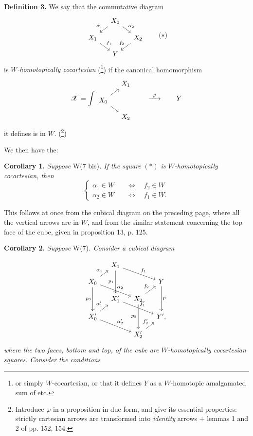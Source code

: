 \documentclass[11pt]{article}
\newcommand{\printedpage}[1]{\marginpar{\footnotesize p.~#1}}
\newcommand{\msp}[1]{\marginpar{\footnotesize [#1]}}
\newcommand{\sX}{\mathscr{X}}
\begin{document}
\setcounter{footnote}{85}
\textbf{Definition 3.} We say that the commutative diagram
\[
\begin{tikzcd}[row sep=small, column sep=small]
 & X_0 \arrow[dl, "\alpha_1"'] \arrow[dr, "\alpha_2"] & \\
X_1 \arrow[dr, "f_1"] & & X_2 \arrow[dl, "f_2"'] \\
 & Y &
\end{tikzcd}
\tag*{$(*)$}
\]
is \textit{$W$-homotopically cocartesian} (\footnote{or simply $W$-cocartesian, or that it defines $Y$ as a $W$-homotopic amalgamated sum of etc.}) if the canonical homomorphism
\[
\sX = \int
\begin{tikzcd}[row sep=small, column sep=small]
 & X_1 \\
X_0 \arrow[ur] \arrow[dr] & \\
 & X_2
\end{tikzcd}
\qquad \xrightarrow{\ \varphi\ } \qquad Y
\]
it defines is in $W$. (\footnote{Introduce $\varphi$ in a proposition in due form, and give its essential properties: strictly cartesian arrows are transformed into \textit{identity} arrows $+$ lemmas 1 and 2 of pp. 152, 154.})

\msp{page 132}
We then have the:

\textbf{Corollary 1.} \textit{Suppose} W(7 bis)\textit{. If the square} $(*)$ \textit{is $W$-homotopically cocartesian, then}
\[
\left\{
\begin{aligned}
\alpha_1 \in W &\quad\iff\quad f_2 \in W \\
\alpha_2 \in W &\quad\iff\quad f_1 \in W.
\end{aligned}
\right.
\]

This follows at once from the cubical diagram on the preceding page, where all the vertical arrows are in $W$, and from the similar statement concerning the top face of the cube, given in proposition 13, p. 125.

\textbf{Corollary 2.} \textit{Suppose} W(7)\textit{. Consider a cubical diagram}

\printedpage{90}
\[
\begin{tikzcd}[row sep=small, column sep=small]
 & X_1 \arrow[dd, "p_1"'] \arrow[rrd, "f_1"] & & \\
X_0 \arrow[ru, "\alpha_1"] \arrow[rrd, "\alpha_2"] \arrow[dd, "p_0"'] & & & Y \arrow[dd, "p"] \\
 & X'_1 \arrow[rrd, "f'_1"] & X_2 \arrow[ru, "f_2"] \arrow[dd, "p_2"'] & \\
X'_0 \arrow[ru, "\alpha'_1"] \arrow[rrd, "\alpha'_2"] & & & Y', \\
 & & X'_2 \arrow[ru, "f'_2"] &
\end{tikzcd}
\]
\textit{where the two faces, bottom and top, of the cube are $W$-homotopically cocartesian squares. Consider the conditions}
\end{document}
